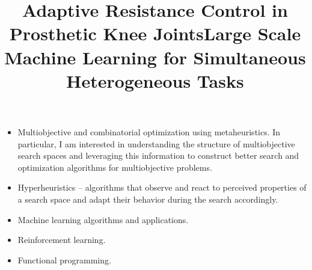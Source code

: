 \documentclass[a4paper,10pt]{cvclean}
\begin{document}
\setmainfont[Mapping=tex-text]{Cambria}
\makeheader


\begin{education}
\begin{degree}
\end{degree}
\begin{degree}
\end{degree}
\begin{degree}
\end{degree}
\end{education}


\begin{Research Interests}
\begin{itemize}
\item Multiobjective and combinatorial optimization using metaheuristics. In
  particular, I am interested in understanding the structure of multiobjective
  search spaces and leveraging this information to construct better search and
  optimization algorithms for multiobjective problems.
\item Hyperheuristics -- algorithms that observe and react to perceived
  properties of a search space and adapt their behavior during the search
  accordingly.
\item Machine learning algorithms and applications.
\item Reinforcement learning.
\item Functional programming.
\end{itemize}
\end{Research Interests}


\begin{awards}
\begin{award}
  \title{Adaptive Resistance Control in Prosthetic Knee Joints}
\end{award}
\begin{award}
  \title{Large Scale Machine Learning for Simultaneous Heterogeneous Tasks}
\end{award}
\end{awards}
  
\end{document}
